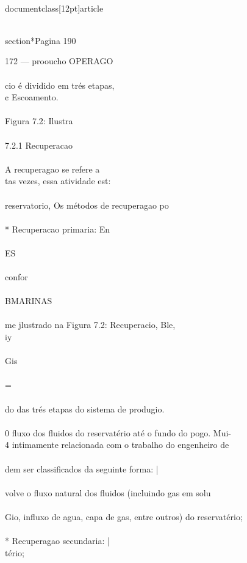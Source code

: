 \\documentclass[12pt]{article}
\begin{document}
\\section*{Pagina 190}

172 — prooucho OPERAGO\\
\\
cio é dividido em trés etapas,\\
¢ Escoamento.\\
\\
Figura 7.2: Ilustra\\
\\
7.2.1 Recuperacao\\
\\
A recuperagao se refere a\\
tas vezes, essa atividade est:\\
\\
reservatorio, Os métodos de recuperagao po\\
\\
* Recuperacao primaria: En\\
\\
ES\\
\\
confor\\
\\
BMARINAS\\
\\
me jlustrado na Figura 7.2: Recuperacio, Ble,\\
iy\\
\\
Gis\\
\\
=\\
\\
do das trés etapas do sistema de produgio.\\
\\
0 fluxo dos fluidos do reservatério até o fundo do pogo. Mui-\\
4 intimamente relacionada com o trabalho do engenheiro de\\
\\
dem ser classificados da seguinte forma: |\\
\\
volve o fluxo natural dos fluidos (incluindo gas em solu\\
\\
Gio, influxo de agua, capa de gas, entre outros) do reservatério;\\
\\
* Recuperagao secundaria: |\\
tério;\\
\\
\end{document}
